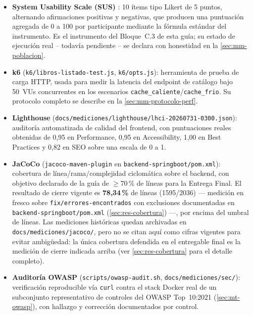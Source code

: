 \begin{itemize}[leftmargin=1.2cm]
  \item \textbf{System Usability Scale (SUS)} \citep{brooke1996sus}: 10
    ítems tipo Likert de 5 puntos, alternando afirmaciones positivas y
    negativas, que producen una puntuación agregada de 0 a 100 por
    participante mediante la fórmula estándar del instrumento. Es el
    instrumento del Bloque~C.3 de esta guía; su estado de ejecución real
    -- todavía pendiente -- se declara con honestidad en la
    \autoref{sec:mm-poblacion}.
  \item \textbf{k6} (\texttt{k6/libros-listado-test.js},
    \texttt{k6/opts.js}): herramienta de prueba de carga HTTP, usada para
    medir la latencia del endpoint de catálogo bajo 50~VUs concurrentes
    en los escenarios \texttt{cache\_caliente}/\texttt{cache\_frio}. Su
    protocolo completo se describe en la \autoref{sec:mm-protocolo-perf}.
  \item \textbf{Lighthouse} (\texttt{docs/mediciones/lighthouse/lhci-20260731-0300.json}):
    auditoría automatizada de calidad del frontend, con puntuaciones
    reales obtenidas de 0,95 en Performance, 0,95 en Accessibility, 1,00
    en Best Practices y 0,82 en SEO sobre una escala de 0 a 1.
  \item \textbf{JaCoCo} (\texttt{jacoco-maven-plugin} en
    \texttt{backend-springboot/pom.xml}): cobertura de línea/rama/complejidad
    ciclomática sobre el backend, con objetivo declarado de la guía de
    $\geq$70\,\% de líneas para la Entrega Final. El resultado de cierre
    vigente es \textbf{78,34\,\%} de líneas (1595/2036) — medición en fresco sobre
    \texttt{fix/errores-encontrados} con exclusiones documentadas en
    \texttt{backend-springboot/pom.xml} (\autoref{sec:res-cobertura}) —, por encima del
    umbral de líneas. Las mediciones históricas quedan archivadas en
    \texttt{docs/mediciones/jacoco/}, pero no se citan aquí como cifras
    vigentes para evitar ambigüedad: la única cobertura defendida en el
    entregable final es la medición de cierre indicada arriba (ver
    \autoref{sec:res-cobertura} para el detalle completo).
  \item \textbf{Auditoría OWASP} (\texttt{scripts/owasp-audit.sh},
    \texttt{docs/mediciones/sec/}): verificación reproducible vía
    \texttt{curl} contra el stack Docker real de un subconjunto
    representativo de controles del OWASP Top~10:2021
    (\autoref{sec:mt-owasp}), con hallazgo y corrección documentados por
    control.
\end{itemize}


